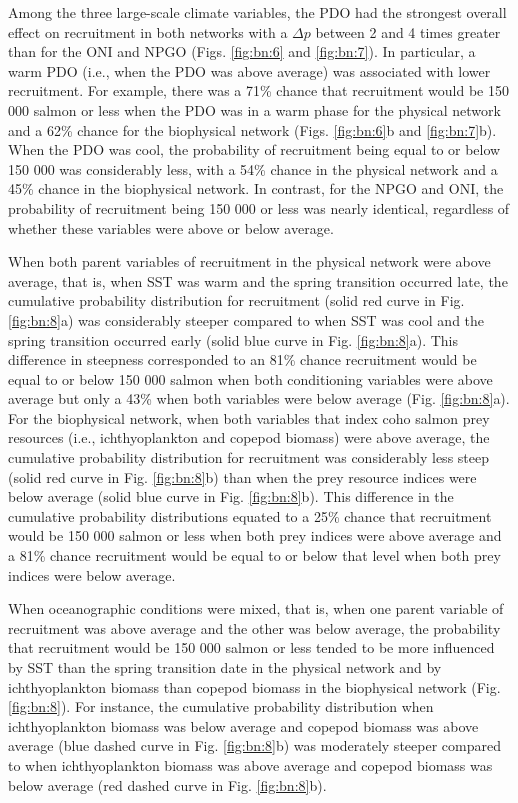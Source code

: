 Among the three large-scale climate variables, the PDO had the strongest overall
effect on recruitment in both networks with a \(\Delta p\) between 2 and 4 times
greater than for the ONI and NPGO (Figs. \ref{fig:bn:6} and \ref{fig:bn:7}). In
particular, a warm PDO (i.e., when the PDO was above average) was associated
with lower recruitment. For example, there was a 71\% chance that recruitment
would be 150 000 salmon or less when the PDO was in a warm phase for the
physical network and a 62\% chance for the biophysical network (Figs.
\ref{fig:bn:6}b and \ref{fig:bn:7}b). When the PDO was cool, the probability of
recruitment being equal to or below 150 000 was considerably less, with a 54\%
chance in the physical network and a 45\% chance in the biophysical network. In
contrast, for the NPGO and ONI, the probability of recruitment being 150 000 or
less was nearly identical, regardless of whether these variables were above or
below average.

When both parent variables of recruitment in the physical network were above
average, that is, when SST was warm and the spring transition occurred late, the
cumulative probability distribution for recruitment (solid red curve in Fig.
\ref{fig:bn:8}a) was considerably steeper compared to when SST was cool and the
spring transition occurred early (solid blue curve in Fig. \ref{fig:bn:8}a).
This difference in steepness corresponded to an 81\% chance recruitment would be
equal to or below 150 000 salmon when both conditioning variables were above
average but only a 43\% when both variables were below average (Fig.
\ref{fig:bn:8}a). For the biophysical network, when both variables that index
coho salmon prey resources (i.e., ichthyoplankton and copepod biomass) were
above average, the cumulative probability distribution for recruitment was
considerably less steep (solid red curve in Fig. \ref{fig:bn:8}b) than when the
prey resource indices were below average (solid blue curve in Fig.
\ref{fig:bn:8}b). This difference in the cumulative probability distributions
equated to a 25\% chance that recruitment would be 150 000 salmon or less when
both prey indices were above average and a 81\% chance recruitment would be
equal to or below that level when both prey indices were below average.

When oceanographic conditions were mixed, that is, when one parent variable of
recruitment was above average and the other was below average, the probability
that recruitment would be 150 000 salmon or less tended to be more influenced by
SST than the spring transition date in the physical network and by
ichthyoplankton biomass than copepod biomass in the biophysical network (Fig.
\ref{fig:bn:8}). For instance, the cumulative probability distribution when
ichthyoplankton biomass was below average and copepod biomass was above average
(blue dashed curve in Fig. \ref{fig:bn:8}b) was moderately steeper compared to
when ichthyoplankton biomass was above average and copepod biomass was below
average (red dashed curve in Fig. \ref{fig:bn:8}b).


